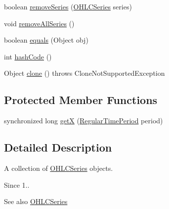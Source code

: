 \begin{DoxyCompactItemize}
boolean \mbox{\hyperlink{classorg_1_1jfree_1_1data_1_1time_1_1ohlc_1_1_o_h_l_c_series_collection_a883bedc4da09a6521b90ff7722eff163}{remove\+Series}} (\mbox{\hyperlink{classorg_1_1jfree_1_1data_1_1time_1_1ohlc_1_1_o_h_l_c_series}{O\+H\+L\+C\+Series}} series)
\item 
void \mbox{\hyperlink{classorg_1_1jfree_1_1data_1_1time_1_1ohlc_1_1_o_h_l_c_series_collection_a638ebd08a6997ef301cd1beab94b54dc}{remove\+All\+Series}} ()
\item 
boolean \mbox{\hyperlink{classorg_1_1jfree_1_1data_1_1time_1_1ohlc_1_1_o_h_l_c_series_collection_aa97178757d8bccb01f9edfe41405a7c3}{equals}} (Object obj)
\item 
int \mbox{\hyperlink{classorg_1_1jfree_1_1data_1_1time_1_1ohlc_1_1_o_h_l_c_series_collection_abdd77dd5e7e3fe69e1683c76434f42f6}{hash\+Code}} ()
\item 
Object \mbox{\hyperlink{classorg_1_1jfree_1_1data_1_1time_1_1ohlc_1_1_o_h_l_c_series_collection_a24b1ac1339e833f77fa1b69e0814479a}{clone}} ()  throws Clone\+Not\+Supported\+Exception 
\end{DoxyCompactItemize}
\subsection*{Protected Member Functions}
\begin{DoxyCompactItemize}
\item 
synchronized long \mbox{\hyperlink{classorg_1_1jfree_1_1data_1_1time_1_1ohlc_1_1_o_h_l_c_series_collection_aa5b4ab59465ee04c036189537a4ca7ae}{getX}} (\mbox{\hyperlink{classorg_1_1jfree_1_1data_1_1time_1_1_regular_time_period}{Regular\+Time\+Period}} period)
\end{DoxyCompactItemize}


\subsection{Detailed Description}
A collection of \mbox{\hyperlink{classorg_1_1jfree_1_1data_1_1time_1_1ohlc_1_1_o_h_l_c_series}{O\+H\+L\+C\+Series}} objects.

\begin{DoxySince}{Since}
1..
\end{DoxySince}
\begin{DoxySeeAlso}{See also}
\mbox{\hyperlink{classorg_1_1jfree_1_1data_1_1time_1_1ohlc_1_1_o_h_l_c_series}{O\+H\+L\+C\+Series}} 
\end{DoxySeeAlso}


